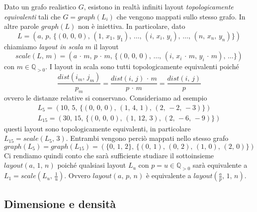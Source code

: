 \documentclass[a4paper,12pt]{article}
\theoremstyle{definition}
\begin{document}
Dato un grafo realistico $G$, esistono in realtà infiniti layout \emph{topologicamente equivalenti} tali che $G = graph(L_i)$ che vengono mappati sullo stesso grafo. In altre parole $graph(L)$ non è iniettiva. In particolare, dato
\begin{equation*}
L = (a,\,p,\,\{(0,\,0,\,0),\,(1,\,x_1,\,y_1),\,\dots,\,(i,\,x_i,\,y_i),\,\dots,\,(n,\,x_n,\,y_n)\})
\end{equation*}
chiamiamo \emph{layout in scala} $m$ il layout
\begin{equation*}
scale(L,\,m) = (a\,\cdot\,m,\,p\,\cdot\,m,\,\{(0,\,0,\,0),\,\dots,\,(i,\,x_i\,\cdot\,m,\,y_i\,\cdot\,m),\,\dots\})
\end{equation*}
con $m \in \mathbb{Q}_{>0}$. I layout in scala sono tutti topologicamente equivalenti poiché
\begin{equation*}
\frac{dist(i_m,\,j_m)}{p_m} = \frac{dist(i,\,j)\,\cdot\,m}{p\,\cdot\,m} = \frac{dist(i,\,j)}{p}	
\end{equation*}
ovvero le distanze relative si conservano. Consideriamo ad esempio
\begin{align*}
L_5 = (10,\,5,\,\{(0,\,0,\,0),\,(1,\,4,\,1),\,(2,\,-2,\,-3)\})\\
L_{15} = (30,\,15,\,\{(0,\,0,\,0),\,(1,\,12,\,3),\,(2,\,-6,\,-9)\})
\end{align*}
questi layout sono topologicamente equivalenti, in particolare $L_{15} = scale(L_5,\,3)$. Entrambi vengono perciò mappati nello stesso grafo
\begin{equation*}
graph(L_5) = graph(L_{15}) = (\{0,\,1,\,2\},\,\{(0,\,1),\,(0,\,2),\,(1,\,0),\,(2,\,0)\})
\end{equation*}
Ci rendiamo quindi conto che sarà sufficiente studiare il sottoinsieme $layout(a,\,1,\,n)$ poiché qualsiasi layout $L_u$ con $p=u \in \mathbb{Q}_{>0}$ sarà equivalente a $L_1 = scale(L_u,\,\frac{1}{u})$. Ovvero $layout(a,\,p,\,n)$ è equivalente a $layout(\frac{a}{p},\,1,\,n)$.

\subsection{Dimensione e densità}


\end{document}
